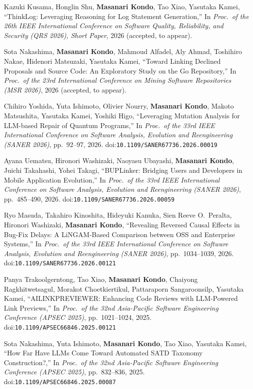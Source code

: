 \documentclass[10pt,a4paper]{article}
\newcommand{\me}{\textbf{Masanari Kondo}}
\begin{document}
\begin{publist}[label={[C\arabic*]}]
  \item Kazuki Kusama, Honglin Shu, \me, Tao Xiao, Yasutaka Kamei, ``ThinkLog: Leveraging Reasoning for Log Statement Generation,'' In \textit{Proc.\ of the 26th IEEE International Conference on Software Quality, Reliability, and Security (QRS 2026), Short Paper}, 2026 (accepted, to appear).
  \item Sota Nakashima, \me, Mahmoud Alfadel, Aly Ahmad, Toshihiro Nakae, Hidenori Matsuzaki, Yasutaka Kamei, ``Toward Linking Declined Proposals and Source Code: An Exploratory Study on the Go Repository,'' In \textit{Proc.\ of the 23rd International Conference on Mining Software Repositories (MSR 2026)}, 2026 (accepted, to appear).
  \item Chihiro Yoshida, Yuta Ishimoto, Olivier Nourry, \me, Makoto Matsushita, Yasutaka Kamei, Yoshiki Higo, ``Leveraging Mutation Analysis for LLM-based Repair of Quantum Programs,'' In \textit{Proc.\ of the 33rd IEEE International Conference on Software Analysis, Evolution and Reengineering (SANER 2026)}, pp.\ 92--97, 2026. doi:\nolinkurl{10.1109/SANER67736.2026.00019}
  \item Ayana Uematsu, Hironori Washizaki, Naoyasu Ubayashi, \me, Juichi Takahashi, Yohei Takagi, ``BUPLinker: Bridging Users and Developers in Mobile Application Evolution,'' In \textit{Proc.\ of the 33rd IEEE International Conference on Software Analysis, Evolution and Reengineering (SANER 2026)}, pp.\ 485--490, 2026. doi:\nolinkurl{10.1109/SANER67736.2026.00059}
  \item Ryo Masuda, Takahiro Kinoshita, Hideyuki Kanuka, Sien Reeve O.\ Peralta, Hironori Washizaki, \me, ``Revealing Reversed Causal Effects in Bug-Fix Delays: A LiNGAM-Based Comparison between OSS and Enterprise Systems,'' In \textit{Proc.\ of the 33rd IEEE International Conference on Software Analysis, Evolution and Reengineering (SANER 2026)}, pp.\ 1034--1039, 2026. doi:\nolinkurl{10.1109/SANER67736.2026.00121}
  \item Panya Trakoolgerntong, Tao Xiao, \me, Chaiyong Ragkhitwetsagul, Morakot Choetkiertikul, Pattaraporn Sangaroonsilp, Yasutaka Kamei, ``AILINKPREVIEWER: Enhancing Code Reviews with LLM-Powered Link Previews,'' In \textit{Proc.\ of the 32nd Asia-Pacific Software Engineering Conference (APSEC 2025)}, pp.\ 1021--1024, 2025. doi:\nolinkurl{10.1109/APSEC66846.2025.00121}
  \item Sota Nakashima, Yuta Ishimoto, \me, Tao Xiao, Yasutaka Kamei, ``How Far Have LLMs Come Toward Automated SATD Taxonomy Construction?,'' In \textit{Proc.\ of the 32nd Asia-Pacific Software Engineering Conference (APSEC 2025)}, pp.\ 832--836, 2025. doi:\nolinkurl{10.1109/APSEC66846.2025.00087}

\end{publist}
\end{document}
